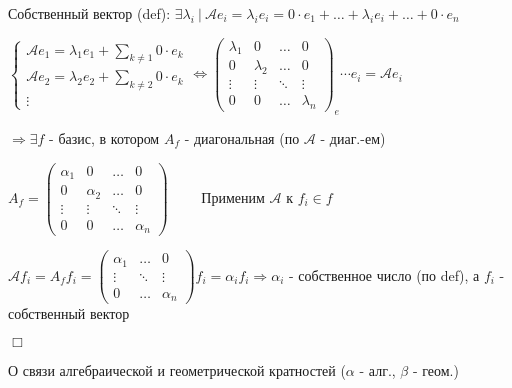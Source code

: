 \documentclass[12pt]{article}
\begin{document}
    Собственный вектор (def): $\exists \lambda_i \ | \ \mathcal{A}e_i = \lambda_i e_i = 0 \cdot e_1 + \dots + \lambda_i e_i + \dots + 0 \cdot e_n$

    $\begin{cases}
         \mathcal{A}e_1 = \lambda_1 e_1 + \sum_{k \neq 1} 0 \cdot e_k \\
         \mathcal{A}e_2 = \lambda_2 e_2 + \sum_{k \neq 2} 0 \cdot e_k \\
         \vdots
    \end{cases} \Longleftrightarrow \begin{pmatrix}
                                        \lambda_1 & 0         & \dots  & 0         \\
                                        0         & \lambda_2 & \dots  & 0         \\
                                        \vdots    & \vdots    & \ddots & \vdots    \\
                                        0         & 0         & \dots  & \lambda_n
    \end{pmatrix}_e \cdots e_i = \mathcal{A} e_i$

    $\Longrightarrow \exists f$ - базис, в котором $A_f$ - диагональная (по \Defs $\mathcal{A}$ - диаг.-ем)

    $A_f = \begin{pmatrix}
               \alpha_1 & 0        & \dots  & 0        \\
               0        & \alpha_2 & \dots  & 0        \\
               \vdots   & \vdots   & \ddots & \vdots   \\
               0        & 0        & \dots  & \alpha_n
    \end{pmatrix} \quad\quad$ Применим $\mathcal{A}$ к $f_i \in f$

    $\mathcal{A}f_i = A_f f_i = \begin{pmatrix}
                                    \alpha_1 & \dots  & 0        \\
                                    \vdots   & \ddots & \vdots   \\
                                    0        & \dots  & \alpha_n
    \end{pmatrix} f_i = \alpha_i f_i \Longrightarrow \alpha_i$ - собственное число (по def), а $f_i$ - собственный вектор

    $\Box$

    \Nota О связи алгебраической и геометрической кратностей ($\alpha$ - алг., $\beta$ - геом.)
\end{document}

